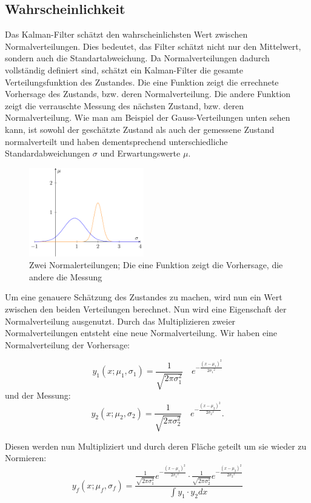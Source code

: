 \subsection{Wahrscheinlichkeit}
Das Kalman-Filter schätzt den wahrscheinlichsten Wert zwischen Normalverteilungen.
Dies bedeutet, das Filter schätzt nicht nur den Mittelwert, sondern auch die Standartabweichung.
Da Normalverteilungen dadurch vollständig definiert sind, schätzt ein Kalman-Filter die gesamte Verteilungsfunktion des Zustandes.
Die eine Funktion zeigt die errechnete Vorhersage des Zustands, bzw. deren Normalverteilung. 
Die andere Funktion zeigt die verrauschte Messung des nächsten Zustand, bzw. deren Normalverteilung. 
Wie man am Beispiel der Gauss-Verteilungen unten sehen kann, ist sowohl der geschätzte Zustand als auch der gemessene Zustand normalverteilt und haben dementsprechend unterschiedliche Standardabweichungen $\sigma$ und Erwartungswerte $\mu$.

\begin{figure}
 \begin{center}
 \includegraphics[width=5cm]{papers/erdbeben/Gausskurve2.pdf}
 \caption{Zwei Normalerteilungen; Die eine Funktion zeigt die Vorhersage, die andere die Messung}
 \end{center}
\end{figure}


Um eine genauere Schätzung des Zustandes zu machen, wird nun ein Wert zwischen den beiden Verteilungen berechnet. 
Nun wird eine Eigenschaft der Normalverteilung ausgenutzt. Durch das Multiplizieren zweier Normalverteilungen entsteht eine neue Normalverteilung. 
Wir haben eine Normalverteilung der Vorhersage:

\[ {y_1}(x;{\mu_1},{\sigma_1})=\frac{1}{\sqrt{2\pi\sigma_1^2}}\quad e^{-\frac{(x-{\mu_1})^2}{2{\sigma_1}^2}} \]
und der Messung:
\[ {y_2}(x;{\mu_2},{\sigma_2})=\frac{1}{\sqrt{2\pi\sigma_2^2}}\quad e^{-\frac{(x-{\mu_2})^2}{2{\sigma_2}^2}}. \]



Diesen werden nun Multipliziert und durch deren Fläche geteilt um sie wieder zu Normieren:
\[
{y_f}(x;{\mu_f},{\sigma_f})=\frac{ \frac{1}{\sqrt{2\pi\sigma_1^2}}e^{-\frac{(x-{\mu_1})^2}{2{\sigma_1}^2}} \cdot \frac{1}{\sqrt{2\pi\sigma_2^2}}e^{-\frac{(x-{\mu_2})^2}{2{\sigma_2}^2}}}{\int {y_1}\cdot{y_2} dx\,}
 \] 

